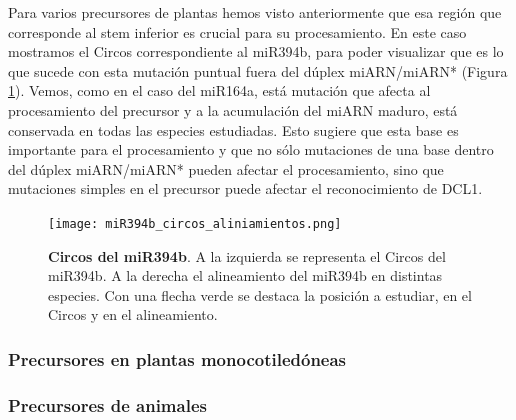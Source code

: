Para varios precursores de plantas hemos visto anteriormente que esa región que corresponde al stem inferior es crucial para su procesamiento.
En este caso mostramos el Circos correspondiente al miR394b, para poder visualizar que es lo que sucede con esta mutación puntual fuera del dúplex miARN/miARN* (Figura \ref{fig:miR394b_circos_aliniamientos}).
Vemos, como en el caso del miR164a, está mutación que afecta al procesamiento del precursor y a la acumulación del miARN maduro, está conservada en todas las especies estudiadas.
Esto sugiere que esta base es importante para el procesamiento y que no sólo mutaciones de una base dentro del dúplex miARN/miARN* pueden afectar el procesamiento, sino que mutaciones simples en el precursor puede afectar el reconocimiento de DCL1. 

\begin{figure}[htbp!] 
	\centering    
	\texttt{[image: miR394b\_circos\_aliniamientos.png]}
	\caption[Circos del miR394b]{
		\textbf{Circos del miR394b}.
		A la izquierda se representa el Circos del miR394b.
		A la derecha el alineamiento del miR394b en distintas especies. 
		Con una flecha verde se destaca la posición a estudiar, en el Circos y en el alineamiento.
	}
	\label{fig:miR394b_circos_aliniamientos}
\end{figure}



\subsubsection{Precursores en plantas monocotiledóneas}


\subsubsection{Precursores de animales}

